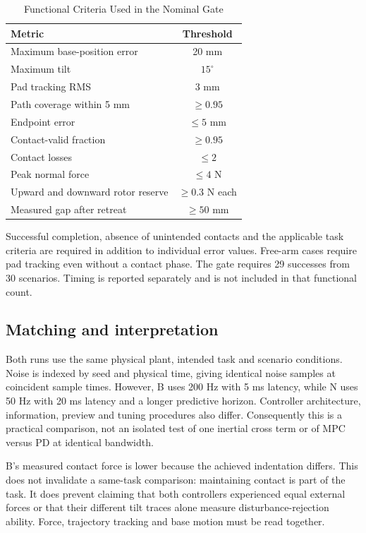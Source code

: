\documentclass[conference]{IEEEtran}
\begin{document}
\begin{table}[t]
\caption{Functional Criteria Used in the Nominal Gate}
\label{tab:criteria}
\centering\footnotesize
\begin{tabular}{lc}\hline
Metric & Threshold\\\hline
Maximum base-position error & 20 mm\\
Maximum tilt & $15^\circ$\\
Pad tracking RMS & 3 mm\\
Path coverage within 5 mm & $\geq0.95$\\
Endpoint error & $\leq5$ mm\\
Contact-valid fraction & $\geq0.95$\\
Contact losses & $\leq2$\\
Peak normal force & $\leq4$ N\\
Upward and downward rotor reserve & $\geq0.3$ N each\\
Measured gap after retreat & $\geq50$ mm\\\hline
\end{tabular}
\end{table}
Successful completion, absence of unintended contacts and the applicable task criteria are required in addition to individual error values. Free-arm cases require pad tracking even without a contact phase. The gate requires 29 successes from 30 scenarios. Timing is reported separately and is not included in that functional count.

\subsection{Matching and interpretation}
Both runs use the same physical plant, intended task and scenario conditions. Noise is indexed by seed and physical time, giving identical noise samples at coincident sample times. However, B uses 200 Hz with 5 ms latency, while N uses 50 Hz with 20 ms latency and a longer predictive horizon. Controller architecture, information, preview and tuning procedures also differ. Consequently this is a practical comparison, not an isolated test of one inertial cross term or of MPC versus PD at identical bandwidth.

B's measured contact force is lower because the achieved indentation differs. This does not invalidate a same-task comparison: maintaining contact is part of the task. It does prevent claiming that both controllers experienced equal external forces or that their different tilt traces alone measure disturbance-rejection ability. Force, trajectory tracking and base motion must be read together.
\end{document}
